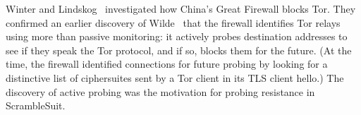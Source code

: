 \documentclass{article}
\begin{document}
Winter and Lindskog~\cite{foci12-winter} investigated how China's Great Firewall blocks Tor.
They confirmed an earlier discovery of Wilde~\cite{wilde} that the firewall identifies Tor relays using more than passive monitoring:
it actively probes destination addresses to see if they speak the Tor protocol, and if so,
blocks them for the future.
(At the time, the firewall identified connections for future probing by looking for a distinctive
list of ciphersuites sent by a Tor client in its TLS client hello.) %
The discovery of active probing was the motivation for probing resistance in ScrambleSuit.


  

\end{document}
